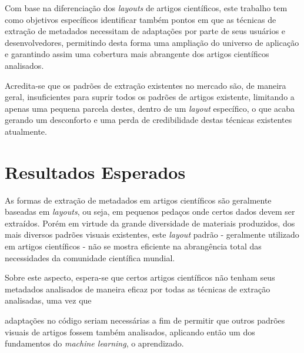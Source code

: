 \begin{textoalterado}

Com base na diferenciação dos \textit{layouts} de artigos científicos, este trabalho tem como objetivos específicos identificar também pontos em que as técnicas de extração de metadados necessitam de adaptações por parte de seus usuários e desenvolvedores, permitindo desta forma uma ampliação do universo de aplicação e garantindo assim uma cobertura mais abrangente dos artigos científicos analisados.

Acredita-se que os padrões de extração existentes no mercado são, de maneira geral, insuficientes para suprir todos os padrões de artigos existente, limitando a apenas uma pequena parcela destes, dentro de um \textit{layout} específico, o que acaba gerando um desconforto e uma perda de credibilidade destas técnicas existentes atualmente.

\end{textoalterado}

\section{Resultados Esperados}


\begin{textoalterado}

As formas de extração de metadados em artigos científicos são geralmente baseadas em \textit{layouts}, ou seja, em pequenos pedaços onde certos dados devem ser extraídos. Porém em virtude da grande diversidade de materiais produzidos, dos mais diversos padrões visuais existentes, este \textit{layout} padrão - geralmente utilizado em artigos científicos - não se mostra eficiente na abrangência total das necessidades da comunidade científica mundial. 

\end{textoalterado}

Sobre este aspecto, espera-se que certos artigos científicos não tenham seus metadados analisados de maneira eficaz por todas as técnicas de extração analisadas, uma vez que \begin{textoalterado}adaptações no código seriam necessárias a fim de permitir que outros padrões visuais de artigos fossem também analisados, aplicando então um dos fundamentos do \textit{machine learning}, o aprendizado. 

\end{textoalterado}

